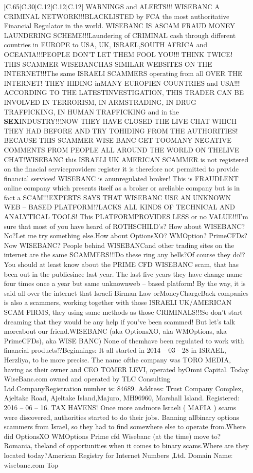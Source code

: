 \documentclass[11pt]{article}
\newlength\mylength
\begin{document}
\begin{center}
\begin{longtable}{|C{.65\mylength}|C{.30\mylength}|C{.12\mylength}|C{.12\mylength}|C{.12\mylength}|}
  \small WARNINGS and ALERTS!!! WISEBANC A CRIMINAL NETWORK!!!BLACKLISTED by FCA the most authoritative Financial Regulator in the world. WISEBANC IS ASCAM FRAUD MONEY LAUNDERING SCHEME!!!Laundering of CRIMINAL cash through different countries in EUROPE to USA, UK, ISRAEL,SOUTH AFRICA and OCEANIA!!!PEOPLE DON'T LET THEM FOOL YOU!!! THINK TWICE! THIS SCAMMER WISEBANCHAS SIMILAR WEBSITES ON THE INTERNET!!!The same ISRAELI SCAMMERS operating from all OVER THE INTERNET! THEY HIDING inMANY EUROPIEN COUNTRIES and USA!!! ACCORDING TO THE LATESTINVESTIGATION, THIS TRADER CAN BE INVOLVED IN TERRORISM, IN ARMSTRADING, IN DRUG TRAFFICKING, IN HUMAN TRAFFICKING and in the \textbf{SEX}INDUSTRY!!!NOW THEY HAVE CLOSED THE LIVE CHAT WHICH THEY HAD BEFORE AND TRY TOHIDING FROM THE AUTHORITIES! BECAUSE THIS SCAMMER WISE BANC GET TOOMANY NEGATIVE COMMENTS FROM PEOPLE ALL AROUND THE WORLD ON THELIVE CHAT!WISEBANC this ISRAELI UK AMERICAN SCAMMER is not registered on the finacial serviceproviders register it is therefore not permitted to provide financial services! WISEBANC is anunregulated broker! This is FRAUDLENT online company which presents itself as a broker or areliable company but is in fact a SCAM!!!EXPERTS SAYS THAT WISEBANC USE AN UNKNOWN WEB – BASED PLATFORM!?LACKS ALL KINDS OF TECHNICAL AND ANALYTICAL TOOLS! This PLATFORMPROVIDES LESS or no VALUE!!!I'm sure that most of you have heard of ROTHSCHILD's? How about WISEBANC?No?Let me try something else.How about OptionsXO? WMOption? PrimeCFDs? Now WISEBANC? People behind WISEBANCand other trading sites on the internet are the same SCAMMERS!!!Do these ring any bells?Of course they do!?You should at least know about the PRIME CFD WISEBANC scam, that has been out in the publicsince last year. The last five years they have change name four times once a year but same unknownweb – based platform! By the way, it is said all over the internet that Israeli Birman Law orMoneyChargeBack companies is also a scammers, working together with those ISRAELI UK/AMERICAN SCAM FIRMS, they using same methods as those CRIMINALS!!!So don't start dreaming that they would be any help if you've been scammed! But let's talk moreabout our friend.WISEBANC (aka OptionsXO, aka WMOptions, aka PrimeCFDs), aka WISE BANC) None of themhave been regulated to work with financial products!?Beginnings: It all started in 2014 – 03 - 28 in ISRAEL, Herzliya, to be more precise. The name ofthe company was TORO MEDIA, having as their owner and CEO TOMER LEVI, operated byOmni Capital. Today WiseBanc.com owned and operated by TLC Consulting Ltd.CompanyRegistration number is: 84689. Address: Trust Company Complex, Ajeltake Road, Ajeltake Island,Majuro, MH96960, Marshall Island. Registered: 2016 – 06 – 16. TAX HAVENS! Once more andmore Israeli ( MAFIA ) scams were discovered, authorities started to do their jobs. Banning allbinary options scammers from Israel, so they had to find somewhere else to operate from.Where did OptionsXO WMOptions Prime cfd  Wisebanc (at the time) move to? Romania, theland of opportunities when it comes to binary scams.Where are they located today?American Registry for Internet Numbers ,Ltd. Domain Name: wisebanc.com Top 
\end{longtable}
\end{center}
\end{document}
